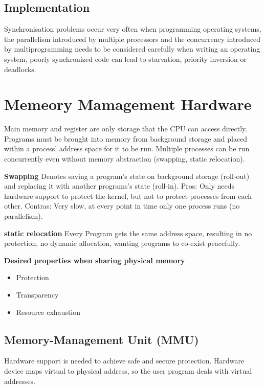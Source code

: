 \documentclass[11pt,a4paper]{article}
\begin{document}
	
	\subsection{Implementation}
	Synchronisation problems occur very often when programming operating systems, the parallelism introduced by multiple processors and the concurrency introduced by multiprogramming needs to be considered carefully when writing an operating system, poorly synchronized code can lead to starvation, priority inversion or deadlocks. \newline
	
	\section{Memeory Mamagement Hardware}
	Main memory and register are only storage that the CPU can access directly. Programs must be brought into memory from background storage and placed within a process' address space for it to be run. Multiple processes can be run concurrently even without memory abstraction (swapping, static relocation).
	
	\textbf{Swapping} \newline
	Denotes saving a program's state on background storage (roll-out) and replacing it with another programs's state (roll-in). \newline
	Pros: Only needs hardware support to protect the kernel, but not to protect processes from each other. \newline
	Contras: Very slow, at every point in time only one process runs (no parallelism). \newline
	
	\textbf{static relocation} \newline
	Every Program gets the same address space, resulting in no protection, no dynamic allocation, wanting programs to co-exist peacefully. \newline
	
	\textbf{Desired properties when sharing physical memory}
	\begin{itemize}
		\item Protection
		\item Transparency
		\item Resource exhaustion
	\end{itemize}

	\subsection{Memory-Management Unit (MMU)}
	Hardware support is needed to achieve safe and secure protection. Hardware device maps virtual to physical address, so the user program deals with virtual addresses. \newline
	
\end{document}

